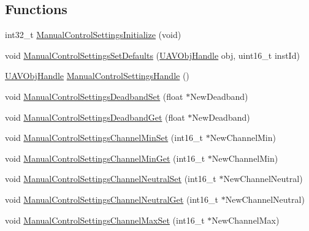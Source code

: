\subsection*{\-Functions}
\begin{DoxyCompactItemize}
\item 
int32\-\_\-t \hyperlink{group___manual_control_settings_ga43a6b88b379de5cc6daf3e23d9823383}{\-Manual\-Control\-Settings\-Initialize} (void)
\item 
void \hyperlink{group___manual_control_settings_ga4ab5a7a68c7ff757738dd5a211a9d2b9}{\-Manual\-Control\-Settings\-Set\-Defaults} (\hyperlink{targets_2_u_a_v_objects_2inc_2uavobjectmanager_8h_a279053e22be53ce9f895043aaeb91e3b}{\-U\-A\-V\-Obj\-Handle} obj, uint16\-\_\-t inst\-Id)
\item 
\hyperlink{targets_2_u_a_v_objects_2inc_2uavobjectmanager_8h_a279053e22be53ce9f895043aaeb91e3b}{\-U\-A\-V\-Obj\-Handle} \hyperlink{group___manual_control_settings_ga9553b3d9423594d12a98af3a41c3e9b7}{\-Manual\-Control\-Settings\-Handle} ()
\item 
void \hyperlink{group___manual_control_settings_gab5d82709e62ef310b262334505670f3a}{\-Manual\-Control\-Settings\-Deadband\-Set} (float $\ast$\-New\-Deadband)
\item 
void \hyperlink{group___manual_control_settings_gafe8f5da0aae903817b6fc6211981196a}{\-Manual\-Control\-Settings\-Deadband\-Get} (float $\ast$\-New\-Deadband)
\item 
void \hyperlink{group___manual_control_settings_ga7da858ce948ccdd0c1e5d72774be1f2a}{\-Manual\-Control\-Settings\-Channel\-Min\-Set} (int16\-\_\-t $\ast$\-New\-Channel\-Min)
\item 
void \hyperlink{group___manual_control_settings_gaeab9a11ddf16642d66954726aac646cf}{\-Manual\-Control\-Settings\-Channel\-Min\-Get} (int16\-\_\-t $\ast$\-New\-Channel\-Min)
\item 
void \hyperlink{group___manual_control_settings_ga926bd21b2234a607abaf1aa0820aabae}{\-Manual\-Control\-Settings\-Channel\-Neutral\-Set} (int16\-\_\-t $\ast$\-New\-Channel\-Neutral)
\item 
void \hyperlink{group___manual_control_settings_gac0bd9aced524265ae48bf494c20d4765}{\-Manual\-Control\-Settings\-Channel\-Neutral\-Get} (int16\-\_\-t $\ast$\-New\-Channel\-Neutral)
\item 
void \hyperlink{group___manual_control_settings_gaad4ee7cca1f20a00d94f012ebecda898}{\-Manual\-Control\-Settings\-Channel\-Max\-Set} (int16\-\_\-t $\ast$\-New\-Channel\-Max)
\item 

\end{DoxyCompactItemize}
